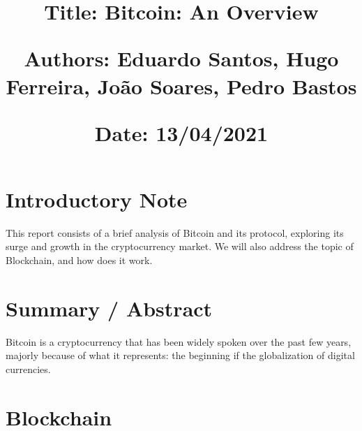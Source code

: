 \documentclass{article}
\newcommand\tab[1][1cm]{\hspace*{#1}}
\begin{document}
\title{\vspace{-0.9cm}
       \vspace{1cm}
       \normalsize
       \raggedright\textbf{Title: \hspace{1.5cm} Bitcoin: An Overview} \\ \vspace{0.4cm}
       \raggedright\textbf{Authors: \hspace{0.95cm} Eduardo Santos, Hugo Ferreira, João Soares, Pedro Bastos} \\ \vspace{0.4cm}
       \raggedright\textbf{Date: \hspace{1.45cm} 13/04/2021} \\}
\author{}
\date{}

\maketitle
\thispagestyle{fancy}


\vspace{-1.4cm}

\tableofcontents


\fontsize{10pt}{13pt}
\selectfont
\lsstyle


\newpage

\section{Introductory Note}

\tab This report consists of a brief analysis of Bitcoin and its protocol, exploring its surge and growth in the cryptocurrency market.
We will also address the topic of Blockchain, and how does it work.

\section{Summary / Abstract}

\tab Bitcoin is a cryptocurrency that has been widely spoken over the past few years, majorly because of what it represents: the beginning if the globalization of digital currencies.

\section{Blockchain}
\end{document}
